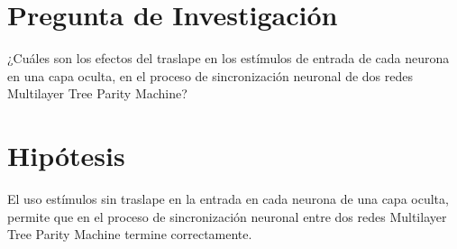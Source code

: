 \section{Pregunta de Investigación}
¿Cuáles son los efectos del traslape en los estímulos de
entrada de cada neurona en una capa oculta, en el proceso de
sincronización neuronal de dos redes Multilayer Tree Parity
Machine?
\section{Hipótesis}
El uso estímulos sin traslape en la entrada en cada neurona de
una capa oculta, permite que en el proceso de sincronización
neuronal entre dos redes Multilayer Tree Parity Machine termine
correctamente.
